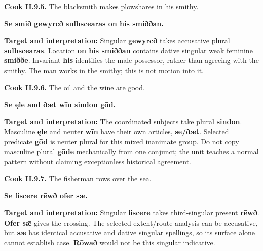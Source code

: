 \par\begin{minipage}{\linewidth}\raggedright
\textbf{Cook II.9.5.} The blacksmith makes plowshares in his smithy.

\textbf{Se smið gewyrcð sulhscearas on his smiððan.}

\textbf{Target and interpretation:} Singular \textbf{gewyrcð} takes accusative plural \textbf{sulhscearas}. Location \textbf{on his smiððan} contains dative singular weak feminine \textbf{smiððe}. Invariant \textbf{his} identifies the male possessor, rather than agreeing with the smithy. The man works in the smithy; this is not motion into it.

\end{minipage}\par\addvspace{4pt}

\par\begin{minipage}{\linewidth}\raggedright
\textbf{Cook II.9.6.} The oil and the wine are good.

\textbf{Se ęle and ðæt wīn sindon gōd.}

\textbf{Target and interpretation:} The coordinated subjects take plural \textbf{sindon}. Masculine \textbf{ęle} and neuter \textbf{wīn} have their own articles, \textbf{se/\allowbreak{}ðæt}. Selected predicate \textbf{gōd} is neuter plural for this mixed inanimate group. Do not copy masculine plural \textbf{gōde} mechanically from one conjunct; the unit teaches a normal pattern without claiming exceptionless historical agreement.

\end{minipage}\par\addvspace{4pt}

\par\begin{minipage}{\linewidth}\raggedright
\textbf{Cook II.9.7.} The fisherman rows over the sea.

\textbf{Se fiscere rēwð ofer sǣ.}

\textbf{Target and interpretation:} Singular \textbf{fiscere} takes third-singular present \textbf{rēwð}. \textbf{Ofer sǣ} gives the crossing. The selected extent/\allowbreak{}route analysis can be accusative, but \textbf{sǣ} has identical accusative and dative singular spellings, so its surface alone cannot establish case. \textbf{Rōwað} would not be this singular indicative.

\end{minipage}\par\addvspace{4pt}


